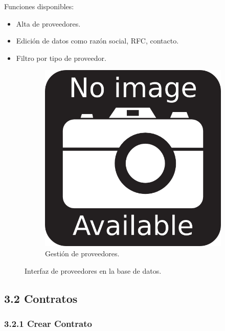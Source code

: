 Funciones disponibles:

\begin{itemize}
    \item Alta de proveedores.
    \item Edición de datos como razón social, RFC, contacto.
    \item Filtro por tipo de proveedor.
\end{itemize}

\begin{figure}[h]
\centering
\begin{subfigure}{0.4\textwidth}
    \includegraphics[width=\textwidth]{imgs/no-image.png}
    \caption{Gestión de proveedores.}
    \label{fig:admin2}
\end{subfigure}
\caption{Interfaz de proveedores en la base de datos.}
\end{figure}

\subsection{3.2 Contratos}

\subsubsection{3.2.1 Crear Contrato}

